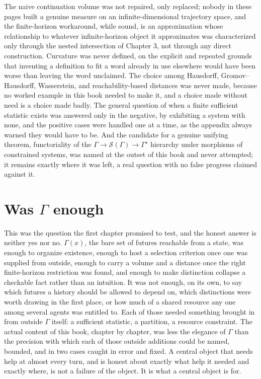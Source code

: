 \documentclass[11pt]{report}
\begin{document}
The naive continuation volume was not repaired, only replaced; nobody
in these pages built a genuine measure on an infinite-dimensional
trajectory space, and the finite-horizon workaround, while sound, is
an approximation whose relationship to whatever infinite-horizon
object it approximates was characterized only through the nested
intersection of Chapter 3, not through any direct construction.
Curvature was never defined, on the explicit and repeated grounds that
inventing a definition to fit a word already in use elsewhere would
have been worse than leaving the word unclaimed. The choice among
Hausdorff, Gromov--Hausdorff, Wasserstein, and reachability-based
distances was never made, because no worked example in this book
needed to make it, and a choice made without need is a choice made
badly. The general question of when a finite sufficient statistic
exists was answered only in the negative, by exhibiting a system
with none, and the positive cases were handled one at a time, as the
appendix always warned they would have to be. And the candidate for a
genuine unifying theorem, functoriality of the $\Gamma \to
\mathcal{S}(\Gamma) \to \Gamma^\star$ hierarchy under morphisms of
constrained systems, was named at the outset of this book and never
attempted; it remains exactly where it was left, a real question with
no false progress claimed against it.

\section*{Was $\Gamma$ enough}

This was the question the first chapter promised to test, and the
honest answer is neither yes nor no. $\Gamma(x)$, the bare set of
futures reachable from a state, was enough to organize existence,
enough to host a selection criterion once one was supplied from
outside, enough to carry a volume and a distance once the right
finite-horizon restriction was found, and enough to make distinction
collapse a checkable fact rather than an intuition. It was not enough,
on its own, to say which futures a history should be allowed to
depend on, which distinctions were worth drawing in the first place,
or how much of a shared resource any one among several agents was
entitled to. Each of those needed something brought in from outside
$\Gamma$ itself: a sufficient statistic, a partition, a resource
constraint. The actual content of this book, chapter by chapter,
was less the elegance of $\Gamma$ than the precision with which each of
those outside additions could be named, bounded, and in two cases
caught in error and fixed. A central object that needs help at almost
every turn, and is honest about exactly what help it needed and
exactly where, is not a failure of the object. It is what a central
object is for.
\end{document}
